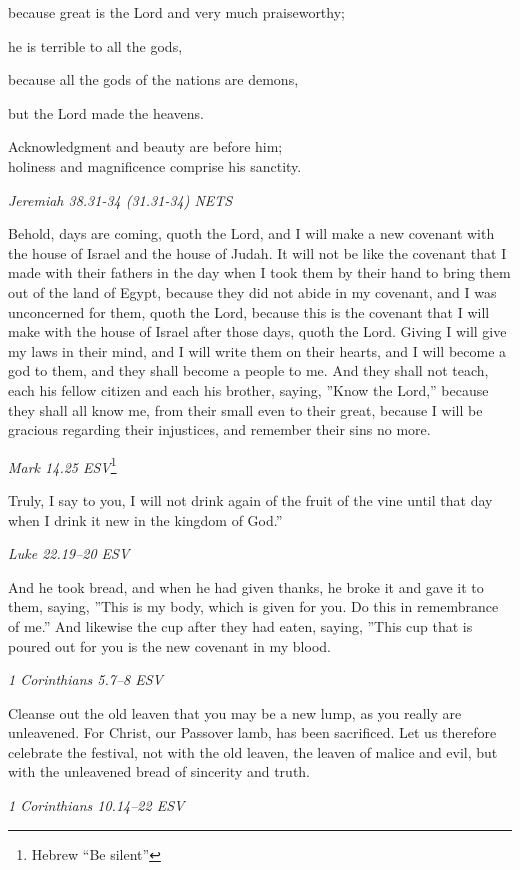 \documentclass[
]{article}
\newcommand{\RL}[1]{\beginR #1\endR}
\begin{document}
because great is the Lord and very much praiseworthy;

he is terrible to all the gods,

because all the gods of the nations are demons,

but the Lord made the heavens.

Acknowledgment and beauty are before him;\\
holiness and magnificence comprise his sanctity.

\emph{Jeremiah 38.31-34 (31.31-34) NETS}

Behold, days are coming, quoth the Lord, and I will make a new covenant
with the house of Israel and the house of Judah. It will not be like the
covenant that I made with their fathers in the day when I took them by
their hand to bring them out of the land of Egypt, because they did not
abide in my covenant, and I was unconcerned for them, quoth the Lord,
because this is the covenant that I will make with the house of Israel
after those days, quoth the Lord. Giving I will give my laws in their
mind, and I will write them on their hearts, and I will become a god to
them, and they shall become a people to me. And they shall not teach,
each his fellow citizen and each his brother, saying, \RL{''}Know the
Lord,'' because they shall all know me, from their small even to their
great, because I will be gracious regarding their injustices, and
remember their sins no more.

\emph{Mark 14.25 ESV}\footnote{Hebrew ``Be silent''}

Truly, I say to you, I will not drink again of the fruit of the vine
until that day when I drink it new in the kingdom of God.''

\emph{Luke 22.19--20 ESV}

And he took bread, and when he had given thanks, he broke it and gave it
to them, saying, \RL{''}This is my body, which is given for you. Do this
in remembrance of me.'' And likewise the cup after they had eaten,
saying, \RL{''}This cup that is poured out for you is the new covenant
in my blood.

\emph{1 Corinthians 5.7--8 ESV}

Cleanse out the old leaven that you may be a new lump, as you really are
unleavened. For Christ, our Passover lamb, has been sacrificed. Let us
therefore celebrate the festival, not with the old leaven, the leaven of
malice and evil, but with the unleavened bread of sincerity and truth.

\emph{1 Corinthians 10.14--22 ESV}
\end{document}
